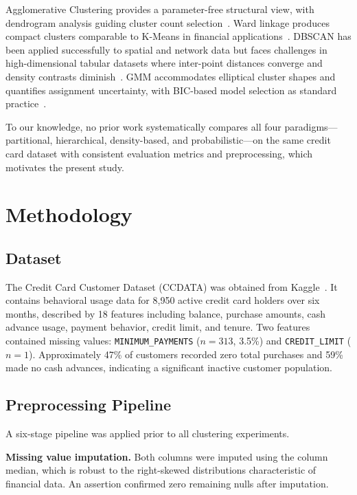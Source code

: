 \documentclass[conference]{IEEEtran}
\begin{document}
Agglomerative Clustering provides a parameter-free structural view,
with dendrogram analysis guiding cluster count
selection~\cite{murtagh2012algorithms}. Ward linkage produces compact
clusters comparable to K-Means in financial
applications~\cite{nielsen2016introduction}. DBSCAN has been applied
successfully to spatial and network data but faces challenges in
high-dimensional tabular datasets where inter-point distances converge
and density contrasts
diminish~\cite{ester1996density,xu2015comprehensive}. GMM
accommodates elliptical cluster shapes and quantifies assignment
uncertainty, with BIC-based model selection as standard
practice~\cite{reynolds2009gaussian,fraley2002model}.

To our knowledge, no prior work systematically compares all four
paradigms---partitional, hierarchical, density-based, and
probabilistic---on the same credit card dataset with consistent
evaluation metrics and preprocessing, which motivates the present
study.

\section{Methodology}
\label{sec:methodology}

\subsection{Dataset}

The Credit Card Customer Dataset (CCDATA) was obtained from
Kaggle~\cite{kaggle_ccdata}. It contains behavioral usage data for
8,950 active credit card holders over six months, described by 18
features including balance, purchase amounts, cash advance usage,
payment behavior, credit limit, and tenure. Two features contained
missing values: \texttt{MINIMUM\_PAYMENTS} ($n{=}313$, 3.5\%) and
\texttt{CREDIT\_LIMIT} ($n{=}1$). Approximately 47\% of customers
recorded zero total purchases and 59\% made no cash advances,
indicating a significant inactive customer population.

\subsection{Preprocessing Pipeline}

A six-stage pipeline was applied prior to all clustering experiments.

\textbf{Missing value imputation.} Both columns were imputed using
the column median, which is robust to the right-skewed distributions
characteristic of financial data. An assertion confirmed zero
remaining nulls after imputation.
\end{document}
